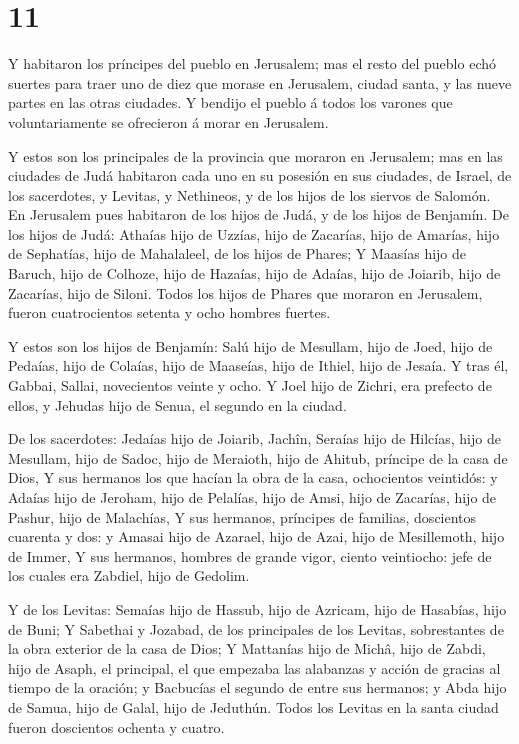 \hypertarget{section-10}{%
\section{11}\label{section-10}}

 Y habitaron los príncipes del pueblo en Jerusalem; mas el
resto del pueblo echó suertes para traer uno de diez que morase en
Jerusalem, ciudad santa, y las nueve partes en las otras ciudades.
 Y bendijo el pueblo á todos los varones que voluntariamente
se ofrecieron á morar en Jerusalem.

 Y estos son los principales de la provincia que moraron en
Jerusalem; mas en las ciudades de Judá habitaron cada uno en su posesión
en sus ciudades, de Israel, de los sacerdotes, y Levitas, y Nethineos, y
de los hijos de los siervos de Salomón.  En Jerusalem pues
habitaron de los hijos de Judá, y de los hijos de Benjamín. De los hijos
de Judá: Athaías hijo de Uzzías, hijo de Zacarías, hijo de Amarías, hijo
de Sephatías, hijo de Mahalaleel, de los hijos de Phares;  Y
Maasías hijo de Baruch, hijo de Colhoze, hijo de Hazaías, hijo de
Adaías, hijo de Joiarib, hijo de Zacarías, hijo de Siloni. 
Todos los hijos de Phares que moraron en Jerusalem, fueron cuatrocientos
setenta y ocho hombres fuertes.

 Y estos son los hijos de Benjamín: Salú hijo de Mesullam,
hijo de Joed, hijo de Pedaías, hijo de Colaías, hijo de Maaseías, hijo
de Ithiel, hijo de Jesaía.  Y tras él, Gabbai, Sallai,
novecientos veinte y ocho.  Y Joel hijo de Zichri, era
prefecto de ellos, y Jehudas hijo de Senua, el segundo en la ciudad.

 De los sacerdotes: Jedaías hijo de Joiarib, Jachîn,
 Seraías hijo de Hilcías, hijo de Mesullam, hijo de Sadoc,
hijo de Meraioth, hijo de Ahitub, príncipe de la casa de Dios,
 Y sus hermanos los que hacían la obra de la casa,
ochocientos veintidós: y Adaías hijo de Jeroham, hijo de Pelalías, hijo
de Amsi, hijo de Zacarías, hijo de Pashur, hijo de Malachías,
 Y sus hermanos, príncipes de familias, doscientos cuarenta
y dos: y Amasai hijo de Azarael, hijo de Azai, hijo de Mesillemoth, hijo
de Immer,  Y sus hermanos, hombres de grande vigor, ciento
veintiocho: jefe de los cuales era Zabdiel, hijo de Gedolim.

 Y de los Levitas: Semaías hijo de Hassub, hijo de Azricam,
hijo de Hasabías, hijo de Buni;  Y Sabethai y Jozabad, de
los principales de los Levitas, sobrestantes de la obra exterior de la
casa de Dios;  Y Mattanías hijo de Michâ, hijo de Zabdi,
hijo de Asaph, el principal, el que empezaba las alabanzas y acción de
gracias al tiempo de la oración; y Bacbucías el segundo de entre sus
hermanos; y Abda hijo de Samua, hijo de Galal, hijo de Jeduthún.
 Todos los Levitas en la santa ciudad fueron doscientos
ochenta y cuatro.

